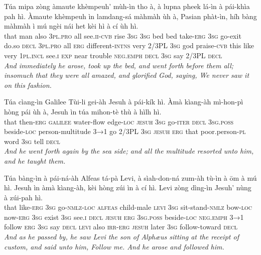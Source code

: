 \documentclass[11pt,a4paper]{article}
\begin{document}
\begin{exe}
\gll Túa mipa zòng àmaute khèmpeuh' mùh-ìn tho à, à lupna pheek lá-ìn à pái-khìa pah hì. Àmaute khèmpeuh ìn lamdang-sá màhmàh ùh à, Pasian phàt-ìn, híh bàng màhmàh ì mú ngèi nái het kèi hì à cí ùh hì. \\
     that man also \textsc{3pl}.\textsc{pro} all see.\textsc{ii}-\textsc{cvb} rise \textsc{3sg} \textsc{3sg} bed bed take-\textsc{erg} \textsc{3sg} go-exit do.so \textsc{decl} \textsc{3pl}.\textsc{pro} all \textsc{erg} different-\textsc{intns} very 2/3PL \textsc{3sg} god praise-\textsc{cvb} this like very \textsc{1pl}.\textsc{incl} see.\textsc{i} \textsc{exp} near trouble \textsc{neg}.\textsc{emph} \textsc{decl} \textsc{3sg} say 2/3PL \textsc{decl} \\
\glt \textcolor{kjvcolor}{\textit{And immediately he arose, took up the bed, and went forth before them all; insomuch that they were all amazed, and glorified God, saying, We never saw it on this fashion.}}

\gll Túa cìang-ìn Galilee Tùi-li gei-àh Jesuh à pái-kík hì. Àmà kìang-àh mì-hon-pì hòng pái ùh à, Jesuh ìn túa mihon-tè thù à hìlh hì. \\
     that then-\textsc{erg} \textsc{galilee} water-flow edge-\textsc{loc} \textsc{jesuh} \textsc{3sg} go-\textsc{iter} \textsc{decl} \textsc{3sg}.\textsc{poss} beside-\textsc{loc} person-multitude \textsc{3→1} go 2/3PL \textsc{3sg} \textsc{jesuh} \textsc{erg} that poor.person-\textsc{pl} word \textsc{3sg} tell \textsc{decl} \\
\glt \textcolor{kjvcolor}{\textit{And he went forth again by the sea side; and all the multitude resorted unto him, and he taught them.}}

\gll Túa bàng-ìn à pái-ná-àh Alfeas tá-pà Levi, à sìah-don-ná zum-àh tù-ìn à ōm à mú hì. Jesuh ìn àmà kìang-àh, kèi hòng zúi ìn à cí hì. Levi zòng dìng-ìn Jesuh' nùng à zúi-pah hì. \\
     that like-\textsc{erg} \textsc{3sg} go-\textsc{nmlz}-\textsc{loc} \textsc{alfeas} child-male \textsc{levi} \textsc{3sg} sit-stand-\textsc{nmlz} bow-\textsc{loc} now-\textsc{erg} \textsc{3sg} exist \textsc{3sg} see.\textsc{i} \textsc{decl} \textsc{jesuh} \textsc{erg} \textsc{3sg}.\textsc{poss} beside-\textsc{loc} \textsc{neg}.\textsc{emph} \textsc{3→1} follow \textsc{erg} \textsc{3sg} say \textsc{decl} \textsc{levi} also \textsc{irr}-\textsc{erg} \textsc{jesuh} later \textsc{3sg} follow-toward \textsc{decl} \\
\glt \textcolor{kjvcolor}{\textit{And as he passed by, he saw Levi the son of Alphæus sitting at the receipt of custom, and said unto him, Follow me. And he arose and followed him.}}


\end{exe}
\end{document}
